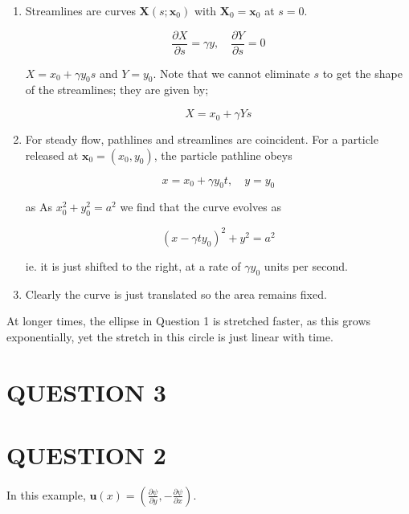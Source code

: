\documentclass[a4paper]{article}
\begin{document}
\begin{enumerate}
	\item Streamlines are curves $ \mathbf{X}(s; \mathbf{x}_{0}) $ with $ \mathbf{X}_{0} = \mathbf{x}_{0} $ at $ s = 0 $. 
	
	\[ \frac{\partial X }{\partial s} = \gamma y, \quad \frac{\partial Y }{\partial s} = 0 \]
	
	$ X = x_{0} + \gamma y_{0} s $ and $ Y = y_{0}$. Note that we cannot eliminate $ s $ to get the shape of the streamlines; they are given by;
	
	\[ X = x_{0} + \gamma Y s \]
	
	\item For steady flow, pathlines and streamlines are coincident. For a particle released at $ \mathbf{x}_{0} = (x_{0},y_{0}) $, the particle pathline obeys
	
	\[ x = x_{0} + \gamma y_{0} t, \quad y = y_{0}  \]
	
	as  As $ x_{0}^{2} + y_{0}^{2} = a^{2} $ we find that the curve evolves as
	
	\[ (x - \gamma t y_{0})^{2} + y^{2} = a^{2}  \]
	
	ie. it is just shifted to the right, at a rate of $ \gamma y_{0} $ units per second. 
	
	\item Clearly the curve is just translated so the area remains fixed.

	
	
\end{enumerate}

At longer times, the ellipse in Question 1 is stretched faster, as this grows exponentially, yet the stretch in this circle is just linear with time. 
	



\section{QUESTION 3}

\section{QUESTION 2}

In this example, $ \mathbf{u}(x) = (\frac{\partial \psi }{\partial y}, - \frac{\partial \psi }{\partial x}) $.
\end{document}
